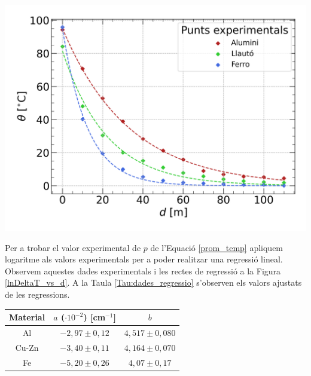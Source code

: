 \documentclass[12pt,twosides,onecolumn,openany]{article}
\newenvironment{Figura}
  {\par\medskip\noindent\minipage{\linewidth}}
  {\endminipage\par\medskip}
\begin{document}
\begin{multicols}{2}
\begin{Figura}
  \centering
  \includegraphics[width = 1\linewidth]{../../graphs/practica_Ia/plots/theta_vs_d_estacionaria.png}\label{DeltaT_vs_d}
\end{Figura}

Per a trobar el valor experimental de $p$ de l'Equació \eqref{prom_temp} apliquem logaritme als valors experimentals per a poder realitzar una regressió lineal. Observem aquestes dades experimentals i les rectes de regressió a la Figura \ref{lnDeltaT_vs_d}. A la Taula \ref{Tau:dades_regressio} s'observen els valors ajustats de les regressions.
\begin{Figura}
  \centering
  \begin{tabular}{c|c|c}
    Material & $a$ ($\cdot 10^{-2}$) [cm$^{-1}$] & $b$\\
    \hline\hline
    Al & $-2,97\pm0,12$ & $4,517\pm0,080$\\
    Cu-Zn & $-3,40\pm0,11$ & $4,164\pm0,070$ \\
    Fe & $-5,20\pm0,26$ & $4,07\pm0,17$
  \end{tabular}
  \label{Tau:dades_regressio}
\end{Figura}


\end{multicols}
\end{document}
